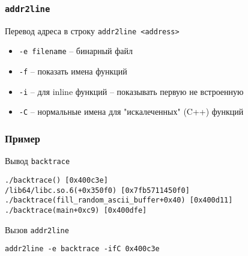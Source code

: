 \begin{frame}[fragile]
	\frametitle{{\tt addr2line}}

	\begin{block}{Перевод адреса в строку}
		{\tt addr2line <address>}

		\begin{itemize}
			\item {\tt -e filename} -- бинарный файл
			\item {\tt -f} -- показать имена функций 
			\item {\tt -i} -- для inline функций -- показывать первую не встроенную
			\item {\tt -C} -- нормальные имена для "искалеченных" (C++) функций
		\end{itemize}
	\end{block}
\end{frame}

\begin{frame}[fragile]
	\frametitle{Пример}

	\begin{block}{Вывод {\tt backtrace}}
	\begin{verbatim}
./backtrace() [0x400c3e]
/lib64/libc.so.6(+0x350f0) [0x7fb5711450f0]
./backtrace(fill_random_ascii_buffer+0x40) [0x400d11]
./backtrace(main+0xc9) [0x400dfe]
	\end{verbatim}

	\end{block}
	\begin{block}{Вызов {\tt addr2line}}
	\begin{verbatim}
addr2line -e backtrace -ifC 0x400c3e
	\end{verbatim}

	\end{block}

\end{frame}


